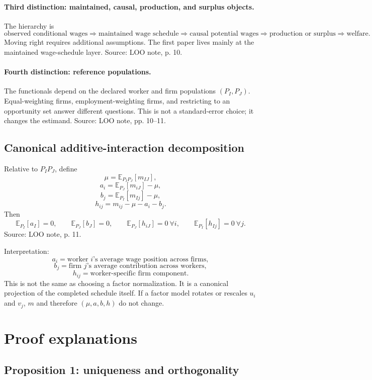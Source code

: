 \documentclass[11pt]{article}
\newcommand{\E}{\mathbb{E}}
\begin{document}
\paragraph{Third distinction: maintained, causal, production, and surplus objects.}
The hierarchy is
\[
\text{observed conditional wages}
\Rightarrow
\text{maintained wage schedule}
\Rightarrow
\text{causal potential wages}
\Rightarrow
\text{production or surplus}
\Rightarrow
\text{welfare}.
\]
Moving right requires additional assumptions. The first paper lives mainly at
the maintained wage-schedule layer. Source: LOO note, p. 10.

\paragraph{Fourth distinction: reference populations.}
The functionals depend on the declared worker and firm populations
\((P_I,P_J)\). Equal-weighting firms, employment-weighting firms, and restricting
to an opportunity set answer different questions. This is not a standard-error
choice; it changes the estimand. Source: LOO note, pp. 10--11.

\subsection{Canonical additive-interaction decomposition}

Relative to \(P_I P_J\), define
\[
\mu=\E_{P_I P_J}[m_{IJ}],
\]
\[
a_i=\E_{P_J}[m_{iJ}]-\mu,
\]
\[
b_j=\E_{P_I}[m_{Ij}]-\mu,
\]
\[
h_{ij}=m_{ij}-\mu-a_i-b_j.
\]
Then
\[
\E_{P_I}[a_I]=0,\qquad
\E_{P_J}[b_J]=0,\qquad
\E_{P_J}[h_{iJ}]=0\ \forall i,\qquad
\E_{P_I}[h_{Ij}]=0\ \forall j.
\]
Source: LOO note, p. 11.

Interpretation:
\[
a_i=\text{worker }i\text{'s average wage position across firms},
\]
\[
b_j=\text{firm }j\text{'s average contribution across workers},
\]
\[
h_{ij}=\text{worker-specific firm component}.
\]
This is not the same as choosing a factor normalization. It is a canonical
projection of the completed schedule itself. If a factor model rotates or
rescales \(u_i\) and \(v_j\), \(m\) and therefore \((\mu,a,b,h)\) do not change.

\section{Proof explanations}

\subsection{Proposition 1: uniqueness and orthogonality}
\end{document}
